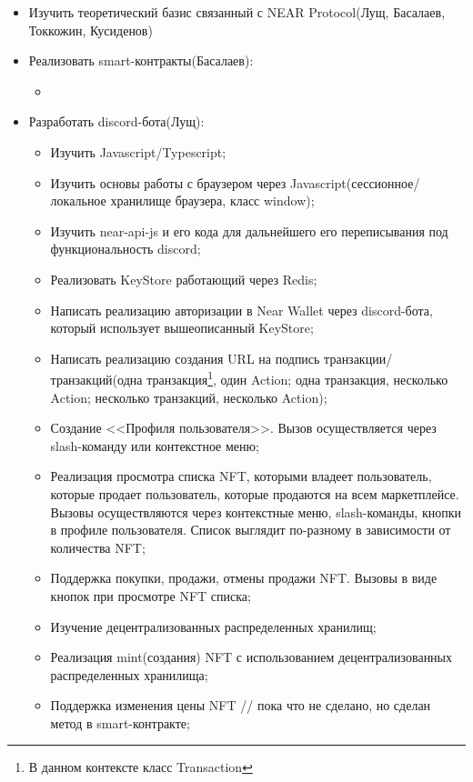 \begin{itemize}
    \item Изучить теоретический базис связанный с NEAR Protocol(Лущ, Басалаев, Токкожин, Кусиденов)
    \item Реализовать smart-контракты(Басалаев):
    \begin{itemize}
        \item
    \end{itemize}
    \item Разработать discord-бота(Лущ):
    \begin{itemize}
        \item Изучить Javascript/Typescript;
        \item Изучить основы работы с браузером через Javascript(сессионное/локальное хранилище браузера, класс window);
        \item Изучить near-api-js и его кода для дальнейшего его переписывания под функциональность discord;
        \item Реализовать KeyStore\cite{nearclasskeystore} работающий через Redis\cite{redis};
        \item Написать реализацию авторизации в Near Wallet\cite{nearwallet} через discord-бота, который использует вышеописанный KeyStore;
        \item Написать реализацию создания URL на подпись транзакции/транзакций(одна транзакция\footnote{В данном контексте класс Transaction\cite{nearclasstransaction}}, один Action\cite{nearclassaction}; одна транзакция, несколько Action; несколько транзакций, несколько Action);
        \item Создание <<Профиля пользователя>>. Вызов осуществляется через slash-команду\cite{discordjsslashcommands} или контекстное меню;
        \item Реализация просмотра списка NFT, которыми владеет пользователь, которые продает пользователь, которые продаются на всем маркетплейсе. Вызовы осуществляются через контекстные меню, slash-команды, кнопки в профиле пользователя. Список выглядит по-разному в зависимости от количества NFT;
        \item Поддержка покупки, продажи, отмены продажи NFT. Вызовы в виде кнопок при просмотре NFT списка;
        \item Изучение децентрализованных распределенных хранилищ;
        \item Реализация mint(создания) NFT с использованием децентрализованных распределенных хранилища;
        \item Поддержка изменения цены NFT // пока что не сделано, но сделан метод в smart-контракте;

\end{itemize}
\end{itemize}
